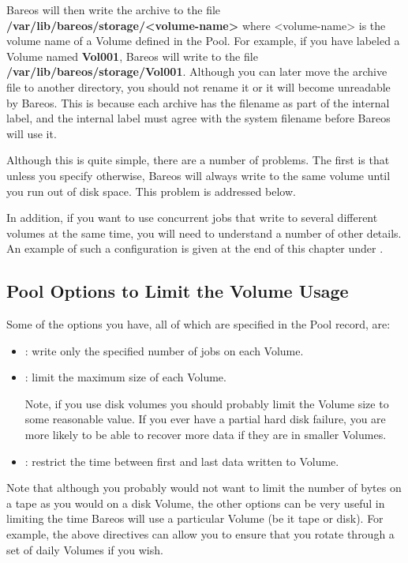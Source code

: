 Bareos will then write the archive to the file {\bf
/var/lib/bareos/storage/{\textless}volume-name{\textgreater}}
where {\textless}volume-name{\textgreater} is the
volume name of a Volume defined in the Pool. For example, if you have labeled
a Volume named {\bf Vol001}, Bareos will write to the file {\bf
/var/lib/bareos/storage/Vol001}. Although you can later move the archive file to
another directory, you should not rename it or it will become unreadable by
Bareos. This is because each archive has the filename as part of the internal
label, and the internal label must agree with the system filename before
Bareos will use it.

Although this is quite simple, there are a number of problems. The first is
that unless you specify otherwise, Bareos will always write to the same volume
until you run out of disk space. This problem is addressed below.

In addition, if you want to use concurrent jobs that write to several
different volumes at the same time, you will need to understand a number
of other details. An example of such a configuration is given
at the end of this chapter under .

\subsection{Pool Options to Limit the Volume Usage}

Some of the options you have, all of which are specified in the Pool record,
are:

\begin{itemize}
\item {}: write only the specified number of jobs on each Volume.
\item {}: limit the maximum size of each Volume.

   Note, if you use disk volumes you should probably limit the Volume size to some reasonable
   value. If you ever have a partial
   hard disk failure, you are more likely to be able to recover more data
   if they are in smaller Volumes.
\item {}: restrict the time between first and last data written to Volume.
\end{itemize}

Note that although you probably would not want to limit the number of bytes on
a tape as you would on a disk Volume, the other options can be very useful in
limiting the time Bareos will use a particular Volume (be it tape or disk).
For example, the above directives can allow you to ensure that you rotate
through a set of daily Volumes if you wish.

